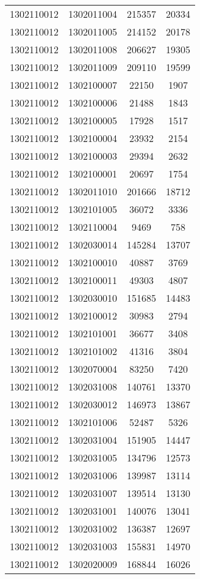 \begin{longtable}{llcc}
1302110012 & 1302011004 & 215357 & 20334\\
1302110012 & 1302011005 & 214152 & 20178\\
1302110012 & 1302011008 & 206627 & 19305\\
1302110012 & 1302011009 & 209110 & 19599\\
1302110012 & 1302100007 & 22150 & 1907\\
1302110012 & 1302100006 & 21488 & 1843\\
1302110012 & 1302100005 & 17928 & 1517\\
1302110012 & 1302100004 & 23932 & 2154\\
1302110012 & 1302100003 & 29394 & 2632\\
1302110012 & 1302100001 & 20697 & 1754\\
1302110012 & 1302011010 & 201666 & 18712\\
1302110012 & 1302101005 & 36072 & 3336\\
1302110012 & 1302110004 & 9469 & 758\\
1302110012 & 1302030014 & 145284 & 13707\\
1302110012 & 1302100010 & 40887 & 3769\\
1302110012 & 1302100011 & 49303 & 4807\\
1302110012 & 1302030010 & 151685 & 14483\\
1302110012 & 1302100012 & 30983 & 2794\\
1302110012 & 1302101001 & 36677 & 3408\\
1302110012 & 1302101002 & 41316 & 3804\\
1302110012 & 1302070004 & 83250 & 7420\\
1302110012 & 1302031008 & 140761 & 13370\\
1302110012 & 1302030012 & 146973 & 13867\\
1302110012 & 1302101006 & 52487 & 5326\\
1302110012 & 1302031004 & 151905 & 14447\\
1302110012 & 1302031005 & 134796 & 12573\\
1302110012 & 1302031006 & 139987 & 13114\\
1302110012 & 1302031007 & 139514 & 13130\\
1302110012 & 1302031001 & 140076 & 13041\\
1302110012 & 1302031002 & 136387 & 12697\\
1302110012 & 1302031003 & 155831 & 14970\\
1302110012 & 1302020009 & 168844 & 16026\\

\end{longtable}
